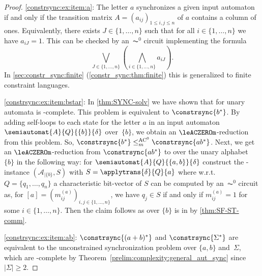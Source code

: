 \begin{proof}
	\ref{constrsync:ex:item:a}: 
	The letter $a$ synchronizes a given input automaton
	if and only if the transition matrix $A = (a_{ij})_{1 \le i,j \le n}$ 
	of $a$ contains a column of ones.
	Equivalently, there exists $J \in \{1,\ldots,n\}$
	such that for all $i \in \{1,\ldots,n\}$ we have 
	$a_{iJ} = 1$.
	This can be checked by an~$\AC^0$ circuit implementing the formula 
	\[
	\bigvee_{J \in \{1,\ldots,n\}} \left( \bigwedge_{i \in \{1,\ldots,n\}} a_{iJ} \right).
	\]
	In \cref{sec:constr_sync:finite} (\cref{constr_sync:thm:finite}) 
	this is generalized to finite constraint languages.
		
	\ref{constrsync:ex:item:bstar}:  
	In \cref{thm:SYNC-solv} we have shown that \DFAST for unary
	automata is \LOGSPACE-complete. This problem is equivalent
	to $\constrsync{b^*}$.			
	By adding self-loops to each state for the letter $a$
	in an input automaton $\semiautomat{A}{Q}{\{b\}}{\delta}$
	over~$\{b\}$, we obtain 
	an $\leACZEROm$-reduction from this problem. So, $\constrsync{b^*} \le_m^{\text{AC}^0} \constrsync{ab^*}$.	
	Next, we get an $\leACZEROm$-reduction
	from $\constrsync{ab^*}$
	to \SFS over the unary alphabet $\{b\}$ 
	in the following way: for $\semiautomat{A}{Q}{\{a,b\}}{\delta}$
	construct the \SFS-instance $(\mathcal A_{|\{b\}}, S)$
	with $S = \applytrans{\delta}{Q}{a}$
	where w.r.t.~$Q = \{q_1, \ldots, q_n\}$
	a characteristic bit-vector of $S$ can 
	be computed by an~$\AC^0$ circuit 
	as, for $[a] = (m_{ij}^{(a)})_{i,j\in \{1,\ldots,n\}}$,
	we have $q_j \in S$ if and only if $m_{ij}^{(a)} = 1$ for some $i \in \{1,\ldots,n\}$.	
	Then the claim follows as \SFS over $\{b\}$ is in \LOGSPACE
	by \cref{thm:SF-ST-comm}. 
		
	\ref{constrsync:ex:item:ab}: $\constrsync{(a+b)^*}$ and $\constrsync{\Sigma^*}$ are
	equivalent to the unconstrained synchronization problem
	over $\{a,b\}$ and~$\Sigma$, which are \NL-complete by Theorem~\ref{prelim:complexity:general_aut_sync}
	since $|\Sigma| \ge 2$.
	

\end{proof}
